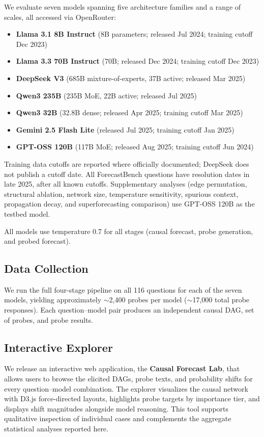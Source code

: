 \documentclass[11pt]{article}
\begin{document}
We evaluate seven models spanning five architecture families and a range of scales, all accessed via OpenRouter:
\begin{itemize}
    \item \textbf{Llama 3.1 8B Instruct} (8B parameters; released Jul 2024; training cutoff Dec 2023)
    \item \textbf{Llama 3.3 70B Instruct} (70B; released Dec 2024; training cutoff Dec 2023)
    \item \textbf{DeepSeek V3} (685B mixture-of-experts, 37B active; released Mar 2025)
    \item \textbf{Qwen3 235B} (235B MoE, 22B active; released Jul 2025)
    \item \textbf{Qwen3 32B} (32.8B dense; released Apr 2025; training cutoff Mar 2025)
    \item \textbf{Gemini 2.5 Flash Lite} (released Jul 2025; training cutoff Jan 2025)
    \item \textbf{GPT-OSS 120B} (117B MoE; released Aug 2025; training cutoff Jun 2024)
\end{itemize}
Training data cutoffs are reported where officially documented; DeepSeek does not publish a cutoff date. All ForecastBench questions have resolution dates in late 2025, after all known cutoffs. Supplementary analyses (edge permutation, structural ablation, network size, temperature sensitivity, spurious context, propagation decay, and superforecasting comparison) use GPT-OSS 120B as the testbed model.

All models use temperature 0.7 for all stages (causal forecast, probe generation, and probed forecast).

\subsection{Data Collection}

We run the full four-stage pipeline on all 116 questions for each of the seven models, yielding approximately ${\sim}$2,400 probes per model (${\sim}$17,000 total probe responses). Each question--model pair produces an independent causal DAG, set of probes, and probe results.

\subsection{Interactive Explorer}

We release an interactive web application, the \textbf{Causal Forecast Lab}, that allows users to browse the elicited DAGs, probe texts, and probability shifts for every question--model combination. The explorer visualizes the causal network with D3.js force-directed layouts, highlights probe targets by importance tier, and displays shift magnitudes alongside model reasoning. This tool supports qualitative inspection of individual cases and complements the aggregate statistical analyses reported here.
\end{document}
